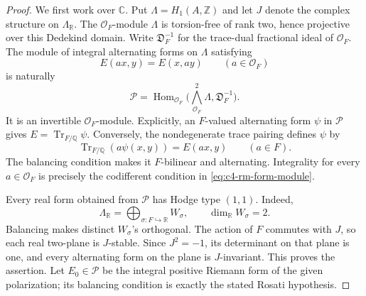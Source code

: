 \begin{proof}
We first work over \(\mathbb C\). Put
\(\Lambda=H_1(A,\mathbb Z)\) and let \(J\) denote the complex
structure on \(\Lambda_{\mathbb R}\).
The \(\mathcal O_F\)-module \(\Lambda\) is torsion-free of
rank two, hence projective over this Dedekind domain.
Write \(\mathfrak D_F^{-1}\) for the trace-dual fractional
ideal of \(\mathcal O_F\). The module of integral alternating
forms on \(\Lambda\) satisfying
\[
                         E(ax,y)=E(x,ay)
                  \qquad(a\in\mathcal O_F)
\]
is naturally
\begin{equation}\label{eq:c4-rm-form-module}
 \mathcal P=
 \operatorname{Hom}_{\mathcal O_F}
       \bigl(\textstyle\bigwedge^2_{\mathcal O_F}\Lambda,
                         \mathfrak D_F^{-1}\bigr).
\end{equation}
It is an invertible \(\mathcal O_F\)-module.
Explicitly, an \(F\)-valued alternating form \(\psi\) in
\(\mathcal P\) gives \(E=\operatorname{Tr}_{F/\mathbb Q}\psi\).
Conversely, the nondegenerate trace pairing defines \(\psi\)
by
\[
          \operatorname{Tr}_{F/\mathbb Q}(a\psi(x,y))
                              =E(ax,y)\qquad(a\in F).
\]
The balancing condition makes it \(F\)-bilinear and alternating.
Integrality for every \(a\in\mathcal O_F\) is precisely the
codifferent condition in \eqref{eq:c4-rm-form-module}.

Every real form obtained from \(\mathcal P\) has Hodge type
\((1,1)\). Indeed,
\[
       \Lambda_{\mathbb R}=\bigoplus_{\sigma:F\hookrightarrow\mathbb R}
                                    W_\sigma,\qquad
                         \dim_{\mathbb R}W_\sigma=2.
\]
Balancing makes distinct \(W_\sigma\)'s orthogonal.
The action of \(F\) commutes with \(J\), so each real
two-plane is \(J\)-stable. Since \(J^2=-1\), its determinant
on that plane is one, and every alternating form on the
plane is \(J\)-invariant. This proves the assertion.
Let \(E_0\in\mathcal P\) be the integral positive Riemann
form of the given polarization; its balancing condition
is exactly the stated Rosati hypothesis.


\end{proof}
